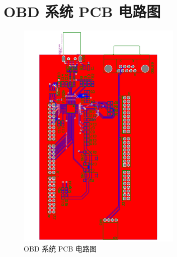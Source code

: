 
\chapter{OBD 系统 PCB 电路图}

\begin{figure}[h]
	\centering
	\includegraphics[width=0.7\textwidth]{figures/PCB1.pdf}
	\caption{OBD 系统 PCB 电路图}\label{fig:PCB}
\end{figure}
